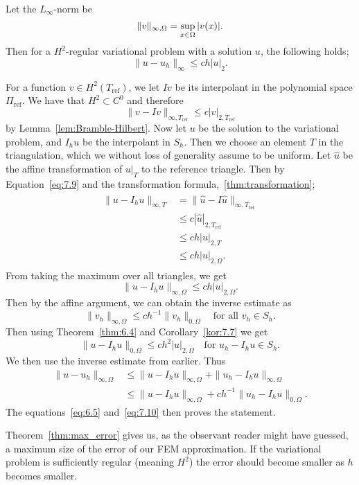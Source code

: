 \begin{thmx}{\quad\label{thm:max_error}}
    Let the $L_\infty$-norm be 
    \begin{equation*}
        \|v\|_{\infty, \Omega} = \sup_{x\in\Omega} |v(x)|.
    \end{equation*}
    Then 
    for a $H^2$-regular variational problem with a solution $u$, the following holds;
    \begin{equation}
        \|u-u_h\|_{\infty}\leq ch|u|_2.
    \end{equation}
\end{thmx}
\begin{bev}
    For a function $v\in H^2(T_{\text{ref}})$, we let $Iv$ be its interpolant in the polynomial space $\Pi_{\text{ref}}$.
    We have that $H^2\subset C^0$ and therefore 
    \begin{equation}
        \|v-Iv\|_{\infty,T_\text{ref}} \leq c|v|_{2,T_\text{ref}}
        \label{eq:7.9}
    \end{equation}
    by Lemma~\ref{lem:Bramble-Hilbert}.
    Now let $u$ be the solution to the variational problem, and $I_h u$ be the interpolant in $S_h$.
    Then we choose an element $T$ in the triangulation, which we without loss of generality assume to be uniform. 
    Let $\hat{u}$ be the affine transformation of $u|_T$ to the reference triangle.
    Then by Equation~\ref{eq:7.9} and the transformation formula,~\ref{thm:transformation};
    \begin{align}
        \begin{split}
            \|u-I_h u\|_{\infty,T} &= \|\hat{u} - I\hat{u}\|_{\infty,T_{\text{ref}}} \\
            &\leq c|\hat{u}|_{2,T_{\text{ref}}} \\
            &\leq ch|u|_{2,T} \\
            &\leq ch|u|_{2,\Omega}.
        \end{split}
        \label{eq:7.10}
    \end{align}
    From taking the maximum over all triangles, we get
    \begin{equation}
        \|u - I_h u \|_{\infty,\Omega} \leq ch|u|_{2,\Omega}.
    \end{equation}
    Then by the affine argument, we can obtain the inverse estimate as
    \begin{equation}
        \|v_h\|_{\infty,\Omega} \leq ch^{-1} \|v_h\|_{0,\Omega} \quad \text{for all } v_h\in S_h.
    \end{equation}
    Then using Theorem~\ref{thm:6.4} and Corollary~\ref{kor:7.7}
    we get
    \begin{equation}
        \|u-I_h u\|_{0,\Omega} \leq ch^2|u|_{2,\Omega}\quad \text{for } u_h-I_h u\in S_h.
    \end{equation}
    We then use the inverse estimate from earlier. Thus 
    \begin{align}
        \|u-u_h\|_{\infty,\Omega} &\leq \|u-I_h u\|_{\infty,\Omega} + \|u_h-I_h u\|_{\infty,\Omega} \\
        &\leq \|u-I_h u\|_{\infty,\Omega} + ch^{-1} \|u_h-I_h u\|_{0,\Omega}.
    \end{align}
    The equations~\eqref{eq:6.5} and~\eqref{eq:7.10} then proves the statement.
\end{bev}
Theorem~\ref{thm:max_error} gives us, as the observant reader might have guessed, 
a maximum size of the error of our FEM approximation.
If the variational problem is sufficiently regular (meaning $H^2$)
the error should
become smaller as $h$ becomes smaller.